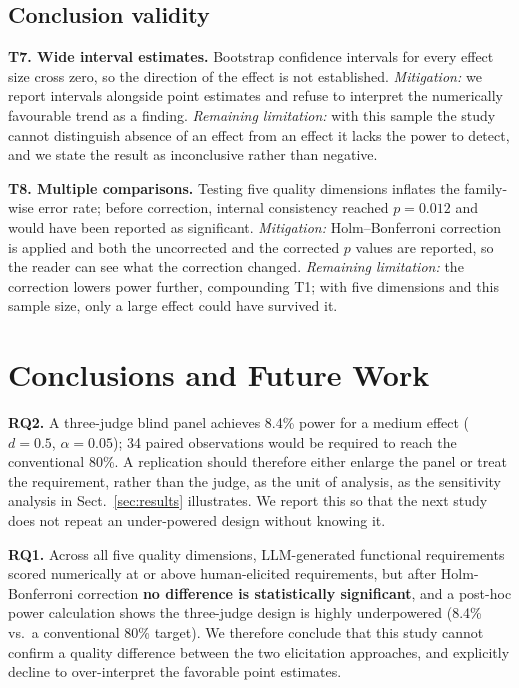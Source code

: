 \documentclass{llncs}
\begin{document}
\subsection{Conclusion validity}

\textbf{T7. Wide interval estimates.} Bootstrap confidence intervals for every
effect size cross zero, so the direction of the effect is not established.
\emph{Mitigation:} we report intervals alongside point estimates and refuse to
interpret the numerically favourable trend as a finding.
\emph{Remaining limitation:} with this sample the study cannot distinguish
absence of an effect from an effect it lacks the power to detect, and we state
the result as inconclusive rather than negative.

\textbf{T8. Multiple comparisons.} Testing five quality dimensions inflates the
family-wise error rate; before correction, internal consistency reached
$p = 0.012$ and would have been reported as significant. \emph{Mitigation:}
Holm--Bonferroni correction is applied and both the uncorrected and the corrected
$p$ values are reported, so the reader can see what the correction changed.
\emph{Remaining limitation:} the correction lowers power further, compounding T1;
with five dimensions and this sample size, only a large effect could have
survived it.

\section{Conclusions and Future Work}

\textbf{RQ2.} A three-judge blind panel achieves 8.4\% power for a medium effect
($d=0.5$, $\alpha=0.05$); 34 paired observations would be required to reach the
conventional 80\%. A replication should therefore either enlarge the panel or treat the
requirement, rather than the judge, as the unit of analysis, as the sensitivity analysis
in Sect.~\ref{sec:results} illustrates. We report this so that the next study does not
repeat an under-powered design without knowing it.

\textbf{RQ1.} Across all five quality dimensions, LLM-generated functional
requirements scored numerically at or above human-elicited requirements, but after
Holm-Bonferroni correction \textbf{no difference is statistically significant}, and a
post-hoc power calculation shows the three-judge design is highly underpowered
(8.4\% vs.\ a conventional 80\% target). We therefore conclude that this study cannot
confirm a quality difference between the two elicitation approaches, and explicitly
decline to over-interpret the favorable point estimates.
\end{document}
